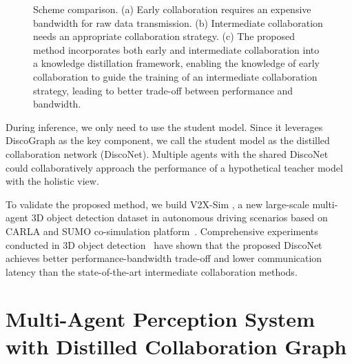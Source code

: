 \documentclass{article}
\begin{document}
\begin{figure}[t]
\centering
   \vspace{-2mm}
\centering
	\vspace{-2mm}
\caption{Scheme comparison. (a) Early collaboration requires an expensive bandwidth for raw data transmission. (b) Intermediate collaboration needs an appropriate collaboration strategy. (c) The proposed method incorporates both early and intermediate collaboration into a knowledge distillation framework, enabling the knowledge of early collaboration to guide the training of an intermediate collaboration strategy, leading to better trade-off between performance and bandwidth.}
\label{fig:fig1}
\vspace{-5mm}
\end{figure}


During inference, we only need to use the student model. Since it leverages DiscoGraph as the key component, we call the student model as the distilled collaboration network (DiscoNet). Multiple agents with the shared DiscoNet could collaboratively approach the performance of a hypothetical teacher model with the holistic view.


To validate the proposed method, we build V2X-Sim , a new large-scale multi-agent 3D object detection dataset in autonomous driving scenarios based on CARLA and SUMO co-simulation platform~\cite{Dosovitskiy17}. Comprehensive experiments conducted in 3D object detection~\cite{zhou2018voxelnet,shi2020points,shi2020point,Li_2021_ICCV} have shown that the proposed DiscoNet achieves better performance-bandwidth trade-off and lower communication latency than the state-of-the-art intermediate collaboration methods.


\vspace{-2mm}
\section{Multi-Agent Perception System with Distilled Collaboration Graph}\label{sec:method}
\vspace{-2mm}
\end{document}

